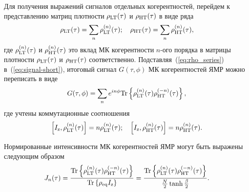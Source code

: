 Для получения выражений сигналов отдельных когерентностей,
перейдем к представлению матриц плотности
$\rho_\mathrm{LT} (\tau)$ и $\rho_\mathrm{HT} (\tau)$
в виде ряда
%
\begin{equation}\label{eq:rho_series}
  \rho_\mathrm{LT} (\tau) = \sum_n \rho_\mathrm{LT}^{(n)}(\tau); \quad
  \rho_\mathrm{HT} (\tau) = \sum_n \rho_\mathrm{HT}^{(n)}(\tau),
\end{equation}
%
где $\rho_\mathrm{LT}^{(n)} (\tau)$ и  $\rho_\mathrm{HT}^{(n)} (\tau)$
это вклад МК когерентности $n$-ого порядка
в матрицы плотности $\rho_\mathrm{LT} (\tau)$ и $\rho_\mathrm{HT} (\tau)$ соответственно.
Подставляя~(\ref{eq:rho_series}) в~(\ref{eq:signal-short}), итоговый сигнал $G(\tau, \phi)$ МК когерентностей ЯМР можно переписать в виде
%
\begin{equation}
    \label{eq:signal_series}
    G(\tau, \phi) = \sum\limits_n
    e^{in\phi}\mathrm{Tr} \left\{ 
    \rho_\mathrm{LT}^{(n)}(\tau) \rho_\mathrm{HT}^{(-n)} (\tau)
     \right\},
\end{equation}
%
где учтены коммутационные соотношения
%
\begin{equation}
    \left[I_\mathrm{z}, \rho_\mathrm{LT}^{(n)} (\tau) \right] = n  \rho_\mathrm{LT}^{(n)} (\tau);
    \quad
    \left[I_\mathrm{z}, \rho_\mathrm{HT}^{(n)} (\tau) \right] = n  \rho_\mathrm{HT}^{(n)} (\tau).
\end{equation}

Нормированные интенсивности МК когерентностей ЯМР могут быть выражены следующим образом
%
\begin{equation}\label{eq:coherence}
    J_n(\tau)
    = \dfrac{
       \mathrm{Tr} \left\{ 
        \rho_\mathrm{LT}^{(n)}(\tau) \rho_\mathrm{HT}^{(-n)} (\tau)
         \right\}
    }{\mathrm{Tr} \left\{ \rho_{\mathrm{eq}}I_\mathrm{z} \right\}}
    = \dfrac{
       \mathrm{Tr} \left\{ 
        \rho_\mathrm{LT}^{(n)}(\tau) \rho_\mathrm{HT}^{(-n)} (\tau)
         \right\}
    }{\frac N 2 \tanh \frac \beta 2}.
\end{equation}

